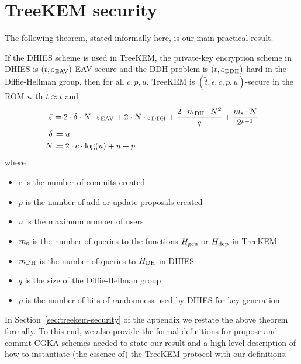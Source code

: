 \section{TreeKEM security}

The following theorem, stated informally here, is our main practical result.

\begin{theorem}[Informal] \label{theorem:treekem-security-informal}
	If the DHIES scheme is used in TreeKEM, the private-key encryption scheme in DHIES is $(t, \varepsilon_\mathrm{EAV})$-EAV-secure and the DDH problem is $(t, \varepsilon_\mathrm{DDH})$-hard in the Diffie-Hellman group, then for all $c, p, u$, TreeKEM is $(\tilde{t}, \tilde{\epsilon}, c, p, u)$-secure in the ROM with $\tilde{t} \approx t$ and
	\begin{align*}
		\tilde{\varepsilon} & = 2 \cdot \delta \cdot N \cdot \varepsilon_\mathrm{EAV} + 2 \cdot N \cdot \varepsilon_\mathrm{DDH} + \frac{2 \cdot m_\mathrm{DH} \cdot N^2}{q} + \frac{m_\mathrm{s} \cdot N}{2^{\rho - 1}} \\
		\delta           & \coloneqq u                                                                                                                        \\
		N                & \coloneqq 2 \cdot c \cdot \log(u) + u + p
	\end{align*}
	where
	\begin{itemize}
		\item $c$ is the number of commits created
		\item $p$ is the number of add or update proposals created
		\item $u$ is the maximum number of users
		\item $m_\mathrm{s}$ is the number of queries to the functions $H_\mathrm{gen}$ or $H_\mathrm{dep}$ in TreeKEM
		\item $m_\mathrm{DH}$ is the number of queries to $H_\mathrm{DH}$ in DHIES
		\item $q$ is the size of the Diffie-Hellman group
		\item $\rho$ is the number of bits of randomness used by DHIES for key generation
	\end{itemize}
\end{theorem}

In Section~\ref{sec:treekem-security} of the appendix we restate the above theorem formally. To this end, we also provide the formal definitions for propose and commit CGKA schemes needed to state our result and a high-level description of how to instantiate (the essence of) the TreeKEM protocol with our definitions.

